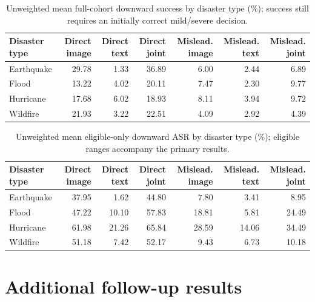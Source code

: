 \begin{table}[!htbp]
  \caption{Unweighted mean full-cohort downward success by disaster type (\%); success still requires an initially correct mild/severe decision.}
  \label{tab:disaster_full_mean}
  \centering
  \scriptsize
  \begin{tabular}{lrrrrrr}
    \toprule
    Disaster type & Direct image & Direct text & Direct joint & Mislead. image & Mislead. text & Mislead. joint \\
    \midrule
    Earthquake & 29.78 & 1.33 & 36.89 & 6.00 & 2.44 & 6.89 \\
    Flood & 13.22 & 4.02 & 20.11 & 7.47 & 2.30 & 9.77 \\
    Hurricane & 17.68 & 6.02 & 18.93 & 8.11 & 3.94 & 9.72 \\
    Wildfire & 21.93 & 3.22 & 22.51 & 4.09 & 2.92 & 4.39 \\
    \bottomrule
  \end{tabular}
\end{table}

\begin{table}[!htbp]
  \caption{Unweighted mean eligible-only downward ASR by disaster type (\%); eligible ranges accompany the primary results.}
  \label{tab:disaster_cond_mean}
  \centering
  \scriptsize
  \begin{tabular}{lrrrrrr}
    \toprule
    Disaster type & Direct image & Direct text & Direct joint & Mislead. image & Mislead. text & Mislead. joint \\
    \midrule
    Earthquake & 37.95 & 1.62 & 44.80 & 7.80 & 3.41 & 8.95 \\
    Flood & 47.22 & 10.10 & 57.83 & 18.81 & 5.81 & 24.49 \\
    Hurricane & 61.98 & 21.26 & 65.84 & 28.59 & 14.06 & 34.49 \\
    Wildfire & 51.18 & 7.42 & 52.17 & 9.43 & 6.73 & 10.18 \\
    \bottomrule
  \end{tabular}
\end{table}

\FloatBarrier
\section{Additional follow-up results}

